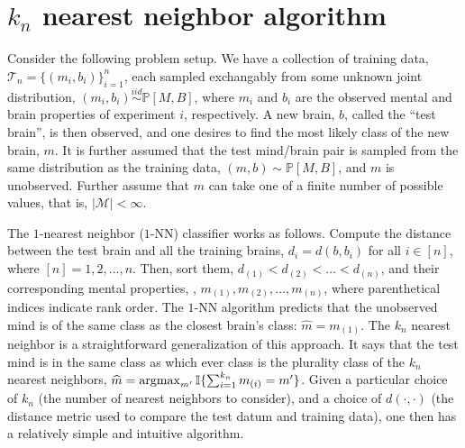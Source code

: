 \documentclass{article}
\newcommand{\PP}{\mathbb{P}}           %
\newcommand{\II}{\mathbb{I}}           %
\providecommand{\mc}[1]{\mathcal{#1}}
\providecommand{\mh}[1]{\widehat{#1}}
\newcommand{\argmax}{\operatornamewithlimits{argmax}}
\begin{document}
\section{$k_n$ nearest neighbor algorithm} %
\label{sec:knn}

Consider the following problem setup.  We have a collection of training data, $\mc{T}_n =\{(m_i,b_i)\}_{i=1}^n$, each sampled exchangably from some unknown joint distribution, $(m_i,b_i)\overset{iid}{\sim} \PP[M,B]$, where $m_i$ and $b_i$ are the observed mental and brain properties of experiment $i$, respectively.  A new brain, $b$, called the ``test brain'', is then observed, and one desires to find the most likely class of the new brain, $m$.  It is further assumed that the test mind/brain pair is sampled from the same distribution as the training data, $(m,b)\sim \PP[M,B]$, and $m$ is unobserved. Further assume that $m$ can take one of a finite number of possible values, that is, $|\mc{M}|<\infty$.

The $1$-nearest neighbor ($1$-NN) classifier works as follows.  Compute the distance between the test brain and all the training brains, $d_i=d(b,b_i)$ for all $i \in [n]$, where $[n]=1,2,\ldots, n$.  Then, sort them, $d_{(1)} < d_{(2)} < \ldots < d_{(n)}$, and their corresponding mental properties, , $m_{(1)}, m_{(2)}, \ldots, m_{(n)}$, where parenthetical indices indicate rank order.  %
The $1$-NN algorithm predicts that the unobserved mind is of the same class as the closest brain's class: $\mh{m}=m_{(1)}$.  The $k_n$ nearest neighbor is a straightforward generalization of this approach.  It says that the test mind is in the same class as which ever class is the plurality class of the $k_n$ nearest neighbors, $\mh{m}=\argmax_{m'}\II\{\sum_{i=1}^{k_n} m_{(i)}=m'\}$.  Given a particular choice of $k_n$ (the number of nearest neighbors to consider), and a choice of $d(\cdot,\cdot)$ (the distance metric used to compare the test datum and training data), one then has a relatively simple and intuitive algorithm.  
\end{document}

